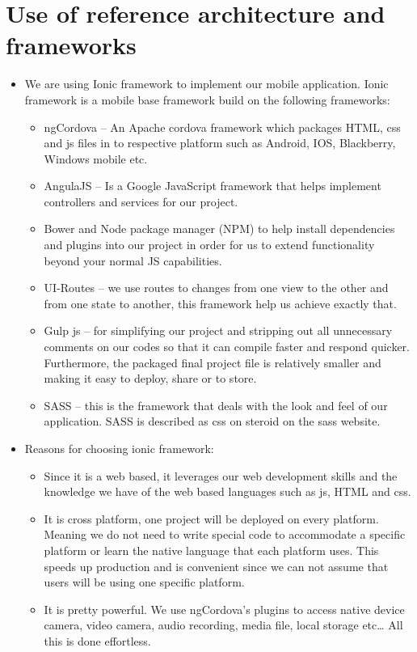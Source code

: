 \documentclass[a4paper,12pt]{article}
\begin{document}
\section{Use of reference architecture and frameworks}
\begin{itemize}
	\item We are using Ionic framework to implement our mobile application. Ionic framework is a mobile base 			framework build on the following frameworks:
	\begin{itemize}
		\item ngCordova – An Apache cordova framework which packages HTML, css and js files in to respective platform such as Android, IOS, Blackberry, Windows mobile etc.
		\item AngulaJS – Is a Google JavaScript framework that helps implement controllers and services 				for our project.
		\item Bower and Node package manager (NPM) to help install dependencies and plugins into our 		project in order for us to extend functionality beyond your normal JS capabilities.
		\item UI-Routes – we use routes to changes from one view to the other and from one state to another, this framework help us achieve exactly that.
		\item Gulp js – for simplifying our project and stripping out all unnecessary comments on our codes so that it can compile faster and respond quicker. Furthermore, the packaged final project file is relatively smaller and making it easy to deploy, share or to store.
		\item  SASS – this is the framework that deals with the look and feel of our application. SASS is described as css on steroid on the sass website.
	\end{itemize}
\item Reasons for choosing ionic framework:
	\begin{itemize}
		\item Since it is a web based, it leverages our web development skills and the knowledge we have of the web based languages such as js, HTML and css.
		\item It is cross platform, one project will be deployed on every platform. Meaning we do not need to write special code to accommodate a specific platform or learn the native language that each platform uses. This speeds up production and is convenient since we can not assume that users will be using one specific platform.
\item It is pretty powerful. We use ngCordova’s plugins to access native device camera, video camera, audio recording, media file, local storage etc… All this is done effortless.

\end{itemize}
\end{itemize}
\end{document}
